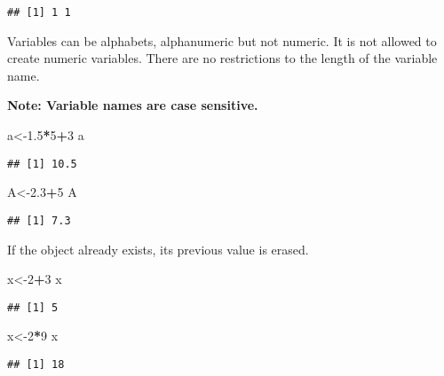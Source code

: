 \documentclass[]{book}
\newenvironment{Shaded}{\begin{snugshade}}{\end{snugshade}}
\newcommand{\DecValTok}[1]{\textcolor[rgb]{0.00,0.00,0.81}{#1}}
\newcommand{\FloatTok}[1]{\textcolor[rgb]{0.00,0.00,0.81}{#1}}
\newcommand{\OperatorTok}[1]{\textcolor[rgb]{0.81,0.36,0.00}{\textbf{#1}}}
\newcommand{\NormalTok}[1]{#1}
\theoremstyle{definition}
\theoremstyle{definition}
\theoremstyle{definition}
\theoremstyle{remark}
\begin{document}
\begin{verbatim}
## [1] 1 1
\end{verbatim}

Variables can be alphabets, alphanumeric but not numeric. It is not
allowed to create numeric variables. There are no restrictions to the
length of the variable name.

\textbf{Note: Variable names are case sensitive.}

\begin{Shaded}
\begin{Highlighting}[]
\NormalTok{a<-}\FloatTok{1.5}\OperatorTok{*}\DecValTok{5}\OperatorTok{+}\DecValTok{3}
\NormalTok{a}
\end{Highlighting}
\end{Shaded}

\begin{verbatim}
## [1] 10.5
\end{verbatim}

\begin{Shaded}
\begin{Highlighting}[]
\NormalTok{A<-}\FloatTok{2.3}\OperatorTok{+}\DecValTok{5}
\NormalTok{A}
\end{Highlighting}
\end{Shaded}

\begin{verbatim}
## [1] 7.3
\end{verbatim}

If the object already exists, its previous value is erased.

\begin{Shaded}
\begin{Highlighting}[]
\NormalTok{x<-}\DecValTok{2}\OperatorTok{+}\DecValTok{3}
\NormalTok{x}
\end{Highlighting}
\end{Shaded}

\begin{verbatim}
## [1] 5
\end{verbatim}

\begin{Shaded}
\begin{Highlighting}[]
\NormalTok{x<-}\DecValTok{2}\OperatorTok{*}\DecValTok{9}
\NormalTok{x}
\end{Highlighting}
\end{Shaded}

\begin{verbatim}
## [1] 18
\end{verbatim}
\end{document}

